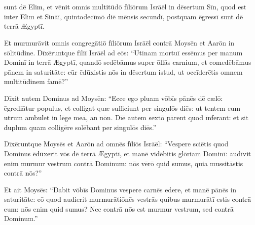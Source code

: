 \chapter{}


\thispagestyle{empty}

 sunt dē Elim, et vēnit omnis multitūdō fīliōrum
Isrāēl in dēsertum Sīn, quod est inter Elim et Sināī,
quintodecīmō diē mēnsis secundī, postquam ēgressī sunt dē terrā Ægyptī.

Et murmurāvit omnis congregātiō fīliōrum
Isrāēl contrā Moysēn et Aarōn in sōlitūdine. Dīxēruntque fīliī Isrāēl ad eōs:
``Utinam mortuī essēmus per manum Dominī in terrā Ægyptī, quandō sedēbāmus
super ōllās carnium, et comedēbāmus pānem in saturitāte: cūr ēdūxistis nōs in
dēsertum istud, ut occīderētis omnem multitūdinem famē?''

Dīxit autem
Dominus ad Moysēn: ``Ecce ego pluam vōbīs pānēs
dē cælō: ēgrediātur populus, et colligat quæ
sufficiunt per singulōs diēs: ut
tentem eum utrum ambulet in lēge meā, an nōn. Dīē autem
sextō pārent quod īnferant: et sit duplum
quam colligēre solēbant per singulōs diēs.''

Dīxēruntque Moysēs et Aarōn ad omnēs fīliōs Isrāēl: ``Vespere sciētis
quod Dominus ēdūxerit vōs dē terrā Ægyptī, et manē vidēbitis glōriam
Dominī: audīvit enim murmur vestrum contrā Dominum: nōs
vērō quid sumus, quia mussitāstis contrā nōs?''

Et ait Moysēs: ``Dabit vōbīs Dominus vespere carnēs edere, et manē pānēs in
saturitāte: eō quod audierit murmurātiōnēs
vestrās quibus murmurātī estis contrā eum: nōs enim
quid sumus? Nec contrā nōs est murmur vestrum, sed contrā Dominum.''

